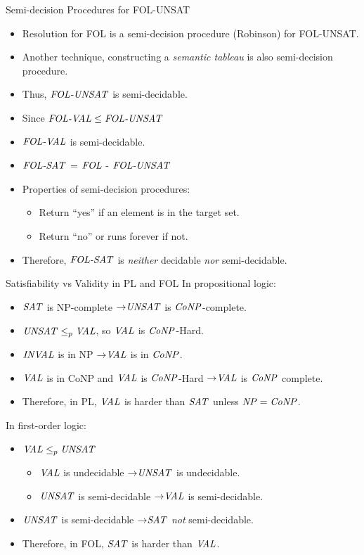 \documentclass[style=sailor,size=12pt]{powerdot}
\begin{document}
\begin{wideslide}[bm=,toc=]{Semi-decision Procedures for FOL-UNSAT}
\begin{itemize}
\item<2-> Resolution for FOL is a semi-decision procedure (Robinson) for FOL-UNSAT.
\item<3-> Another technique, constructing a \emph{semantic tableau} is also
semi-decision procedure.
\item<4-> Thus, $\mbox{\it FOL-UNSAT\/}$ is semi-decidable.
\item<5-> Since $\mbox{\it FOL-VAL\/} \leq \mbox{\it FOL-UNSAT\/}$ 
\item<6-> $\mbox{\it FOL-VAL\/}$ is semi-decidable. 
\end{itemize}
\begin{itemize}
\item<8-> $\mbox{\it FOL-SAT\/}$ = $\mbox{\it FOL\/}$ - $\mbox{\it FOL-UNSAT\/}$
\item<9-> Properties of semi-decision procedures:
\begin{itemize}
\item<10-> Return ``yes'' if an element is in the target set.
\item<11-> Return ``no'' or runs forever if not.
\end{itemize}
\item<12->  Therefore, $\mbox{\it FOL-SAT\/}$ is \emph{neither} decidable \emph{nor}
semi-decidable.
\end{itemize}

\end{wideslide}

\begin{wideslide}[bm=,toc=]{Satisfiability vs Validity in PL and FOL}
In propositional logic:
\begin{itemize}
\item<2-> $\mbox{\it SAT\/}$ is NP-complete $\mathbin{\rightarrow} \mbox{\it UNSAT\/}$ is $\mbox{\it CoNP\/}$-complete. 
\item<3-> $\mbox{\it UNSAT\/} \leq_p \mbox{\it VAL\/}$, so $\mbox{\it VAL\/}$ is $\mbox{\it CoNP\/}$-Hard.
\item<4-> $\mbox{\it INVAL\/}$ is in NP $\mathbin{\rightarrow} \mbox{\it VAL\/}$ is in $\mbox{\it CoNP\/}$.
\item<5-> $\mbox{\it VAL\/}$ is in CoNP and $\mbox{\it VAL\/}$ is $\mbox{\it CoNP\/}$-Hard $\mathbin{\rightarrow} \mbox{\it VAL\/}$ is $\mbox{\it CoNP\/}$
complete.
\item<6-> Therefore, in PL, $\mbox{\it VAL\/}$ is harder than $\mbox{\it SAT\/}$ unless $\mbox{\it NP\/} = \mbox{\it CoNP\/}$.
\end{itemize}
In first-order logic:
\begin{itemize}
\item<7-> $\mbox{\it VAL\/} \leq_p \mbox{\it UNSAT\/}$
\begin{itemize}
\item<8-> $\mbox{\it VAL\/}$ is undecidable $\mathbin{\rightarrow} \mbox{\it UNSAT\/}$ is undecidable. 
\item<9-> $\mbox{\it UNSAT\/}$ is semi-decidable $\mathbin{\rightarrow} \mbox{\it VAL\/}$ is semi-decidable. 
\end{itemize}
\item<10-> $\mbox{\it UNSAT\/}$ is semi-decidable $\mathbin{\rightarrow} \mbox{\it SAT\/}$ \emph{not} semi-decidable. 
\item<11-> Therefore, in FOL, $\mbox{\it SAT\/}$ is harder than $\mbox{\it VAL\/}$.
\end{itemize}
\end{wideslide}
\end{document}
